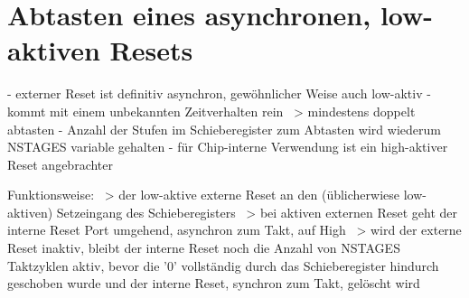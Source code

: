 \section{Abtasten eines asynchronen, low-aktiven Resets} \label{part-3:ASRST}

- externer Reset ist definitiv asynchron, gewöhnlicher Weise auch low-aktiv
- kommt mit einem unbekannten Zeitverhalten rein ~> mindestens doppelt abtasten
- Anzahl der Stufen im Schieberegister zum Abtasten wird wiederum NSTAGES variable gehalten
- für Chip-interne Verwendung ist ein high-aktiver Reset angebrachter



Funktionsweise:
~> der low-aktive externe Reset an den (üblicherwiese low-aktiven) Setzeingang des Schieberegisters
~> bei aktiven externen Reset geht der interne Reset Port umgehend, asynchron zum Takt, auf High
~> wird der externe Reset inaktiv, bleibt der interne Reset noch die Anzahl von NSTAGES Taktzyklen aktiv, bevor die '0' vollständig durch das Schieberegister hindurch geschoben wurde und der interne Reset, synchron zum Takt, gelöscht wird


\clearpage
